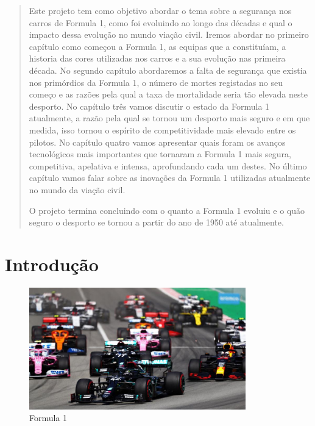 \documentclass{report}
\begin{document}
\begin{abstract}


Este projeto tem como objetivo abordar o tema sobre a segurança nos carros de Formula 1, como foi evoluindo ao longo das décadas e qual o impacto dessa evolução no mundo viação civil.
 Iremos abordar no primeiro capítulo como começou a Formula 1, as equipas que a constituíam, a historia das cores utilizadas nos carros e a sua evolução nas primeira década.
 No segundo capítulo abordaremos a falta de segurança que existia nos primórdios da Formula 1, o número de mortes registadas no seu começo e as razões pela qual a taxa de mortalidade seria tão elevada neste desporto.
No capítulo três vamos discutir o estado da Formula 1 atualmente, a razão pela qual se tornou um desporto mais seguro e em que medida, isso tornou o espírito de competitividade mais elevado entre os pilotos.
No capítulo quatro vamos apresentar quais foram os avanços tecnológicos mais importantes que tornaram a Formula 1 mais segura, competitiva, apelativa e intensa, aprofundando cada um destes. 
No último capítulo vamos falar sobre as inovações da Formula 1 utilizadas atualmente no mundo da viação civil.


O projeto termina concluindo com o quanto a Formula 1 evoluiu e o quão seguro o desporto se tornou a partir do ano de 1950 até atualmente.

\end{abstract}


\tableofcontents


\clearpage
{}

\chapter{Introdução}
\label{chap.introdução}

\begin{figure}[h]
\center %
\includegraphics[height=150pt]{formula1}
\caption{Formula 1}
\label{fig:formula1}
\end{figure}
\end{document}

